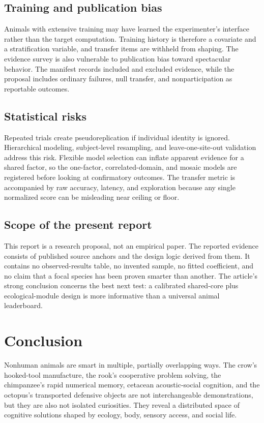 \documentclass[conference]{IEEEtran}
\begin{document}
\subsection{Training and publication bias}
Animals with extensive training may have learned the experimenter's interface rather than the target computation. Training history is therefore a covariate and a stratification variable, and transfer items are withheld from shaping. The evidence survey is also vulnerable to publication bias toward spectacular behavior. The manifest records included and excluded evidence, while the proposal includes ordinary failures, null transfer, and nonparticipation as reportable outcomes.

\subsection{Statistical risks}
Repeated trials create pseudoreplication if individual identity is ignored. Hierarchical modeling, subject-level resampling, and leave-one-site-out validation address this risk. Flexible model selection can inflate apparent evidence for a shared factor, so the one-factor, correlated-domain, and mosaic models are registered before looking at confirmatory outcomes. The transfer metric is accompanied by raw accuracy, latency, and exploration because any single normalized score can be misleading near ceiling or floor.

\subsection{Scope of the present report}
This report is a research proposal, not an empirical paper. The reported evidence consists of published source anchors and the design logic derived from them. It contains no observed-results table, no invented sample, no fitted coefficient, and no claim that a focal species has been proven smarter than another. The article's strong conclusion concerns the best next test: a calibrated shared-core plus ecological-module design is more informative than a universal animal leaderboard.

\section{Conclusion}
Nonhuman animals are smart in multiple, partially overlapping ways. The crow's hooked-tool manufacture, the rook's cooperative problem solving, the chimpanzee's rapid numerical memory, cetacean acoustic-social cognition, and the octopus's transported defensive objects are not interchangeable demonstrations, but they are also not isolated curiosities. They reveal a distributed space of cognitive solutions shaped by ecology, body, sensory access, and social life.
\end{document}
